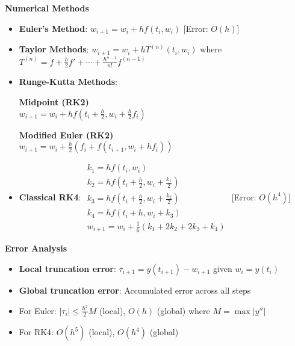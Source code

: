 \documentclass{article}
\begin{document}
\begin{minipage}[t]{0.49\textwidth}
\textbf{Numerical Methods}
\begin{itemize}
\item \textbf{Euler's Method}: $w_{i+1} = w_i + hf(t_i,w_i)$ [Error: $O(h)$]
\item \textbf{Taylor Methods}: $w_{i+1} = w_i + hT^{(n)}(t_i,w_i)$ where 
$T^{(n)} = f + \frac{h}{2}f' + \cdots + \frac{h^{n-1}}{n!}f^{(n-1)}$
\item \textbf{Runge-Kutta Methods}:\\
\begin{minipage}[t]{0.45\textwidth}
    \textbf{Midpoint (RK2)}\\
    $w_{i+1} = w_i + hf(t_i+\frac{h}{2}, w_i+\frac{h}{2}f_i)$
\end{minipage}
\hfill
\begin{minipage}[t]{0.45\textwidth}
    \textbf{Modified Euler (RK2)}\\
    $w_{i+1} = w_i + \frac{h}{2}(f_i + f(t_{i+1},w_i+hf_i))$
\end{minipage}

\item \textbf{Classical RK4}:
$\begin{array}{l}
k_1 = hf(t_i,w_i) \\
k_2 = hf(t_i+\frac{h}{2},w_i+\frac{k_1}{2}) \\
k_3 = hf(t_i+\frac{h}{2},w_i+\frac{k_2}{2}) \\
k_4 = hf(t_i+h,w_i+k_3) \\
w_{i+1} = w_i + \frac{1}{6}(k_1 + 2k_2 + 2k_3 + k_4)
\end{array}$
[Error: $O(h^4)$]
\end{itemize}

\textbf{Error Analysis}
\begin{itemize}
\item \textbf{Local truncation error}: $\tau_{i+1} = y(t_{i+1}) - w_{i+1}$ given $w_i = y(t_i)$
\item \textbf{Global truncation error}: Accumulated error across all steps
\item For Euler: $|\tau_i| \leq \frac{h^2}{2}M$ (local), $O(h)$ (global) where $M = \max|y''|$
\item For RK4: $O(h^5)$ (local), $O(h^4)$ (global)
\end{itemize}

\end{minipage}
\hfill
\end{document}
